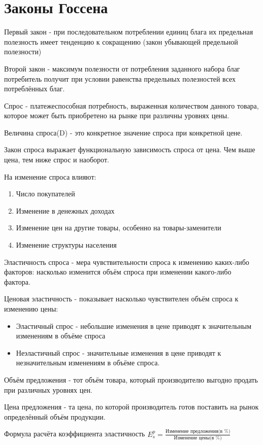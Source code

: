 \documentclass[a4paper, 12pt]{article}
\begin{document}
	\section*{Законы Госсена}
	Первый закон - при последовательном потреблении единиц блага их предельная полезность имеет тенденцию к сокращению (закон убывающей предельной полезности)
	
	Второй закон - максимум полезности от потребления заданного набора благ потребитель получит при условии равенства предельных полезностей всех потреблённых благ.
	
	Спрос - платежеспособная потребность, выраженная количеством данного товара, которое может быть приобретено на рынке при различны уровнях  цены.
	
	Величина спроса(D) - это конкретное значение спроса при конкретной цене.
	
	Закон спроса выражает функциональную зависимость спроса от цена. Чем выше цена, тем ниже спрос и наоборот.
	
	На изменение спроса влияют:
	\begin{enumerate}
		\item Число покупателей
		\item Изменение в денежных доходах
		\item Изменение цен на другие товары, особенно на товары-заменители
		\item Изменение структуры населения
	\end{enumerate}

	Эластичность спроса - мера чувствительности спроса к изменению каких-либо факторов: насколько изменится объём спроса при изменении какого-либо фактора.
	
	Ценовая эластичность - показывает насколько чувствителен объём спроса к изменению цены:
	\begin{itemize}
		\item Эластичный спрос - небольшие изменения в цене приводят к значительным изменениям в объёме спроса
		\item Неэластичный спрос - значительные изменения в цене приводят к незначительным изменениям в объёме спроса.
	\end{itemize}

	Объём предложения - тот объём товара, который производителю выгодно продать при различных уровнях цен.
	
	Цена предложения - та цена, по которой производитель готов поставить на рынок определённый объём продукции.
	
	Формула расчёта коэффициента эластичность $E^p_s = \frac{\text{Изменение предложения(в \%)}}{\text{Изменение цены(в \%)}}$
	
\end{document}
